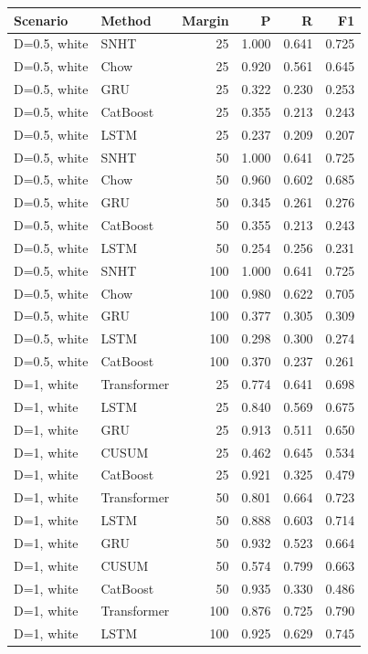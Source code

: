 ﻿\begin{tabular}{llrrrr}
\toprule
Scenario & Method & Margin & P & R & F1 \\
\midrule
D=0.5, white & SNHT & 25 & 1.000 & 0.641 & 0.725 \\
D=0.5, white & Chow & 25 & 0.920 & 0.561 & 0.645 \\
D=0.5, white & GRU & 25 & 0.322 & 0.230 & 0.253 \\
D=0.5, white & CatBoost & 25 & 0.355 & 0.213 & 0.243 \\
D=0.5, white & LSTM & 25 & 0.237 & 0.209 & 0.207 \\
D=0.5, white & SNHT & 50 & 1.000 & 0.641 & 0.725 \\
D=0.5, white & Chow & 50 & 0.960 & 0.602 & 0.685 \\
D=0.5, white & GRU & 50 & 0.345 & 0.261 & 0.276 \\
D=0.5, white & CatBoost & 50 & 0.355 & 0.213 & 0.243 \\
D=0.5, white & LSTM & 50 & 0.254 & 0.256 & 0.231 \\
D=0.5, white & SNHT & 100 & 1.000 & 0.641 & 0.725 \\
D=0.5, white & Chow & 100 & 0.980 & 0.622 & 0.705 \\
D=0.5, white & GRU & 100 & 0.377 & 0.305 & 0.309 \\
D=0.5, white & LSTM & 100 & 0.298 & 0.300 & 0.274 \\
D=0.5, white & CatBoost & 100 & 0.370 & 0.237 & 0.261 \\
D=1, white & Transformer & 25 & 0.774 & 0.641 & 0.698 \\
D=1, white & LSTM & 25 & 0.840 & 0.569 & 0.675 \\
D=1, white & GRU & 25 & 0.913 & 0.511 & 0.650 \\
D=1, white & CUSUM & 25 & 0.462 & 0.645 & 0.534 \\
D=1, white & CatBoost & 25 & 0.921 & 0.325 & 0.479 \\
D=1, white & Transformer & 50 & 0.801 & 0.664 & 0.723 \\
D=1, white & LSTM & 50 & 0.888 & 0.603 & 0.714 \\
D=1, white & GRU & 50 & 0.932 & 0.523 & 0.664 \\
D=1, white & CUSUM & 50 & 0.574 & 0.799 & 0.663 \\
D=1, white & CatBoost & 50 & 0.935 & 0.330 & 0.486 \\
D=1, white & Transformer & 100 & 0.876 & 0.725 & 0.790 \\
D=1, white & LSTM & 100 & 0.925 & 0.629 & 0.745 \\

\end{tabular}
